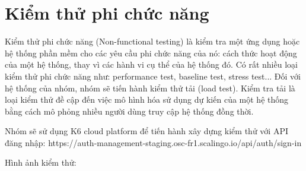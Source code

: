 		\section{Kiểm thử phi chức năng}
		    Kiểm thử phi chức năng (Non-functional testing) là kiểm tra một ứng dụng hoặc hệ thống phần mềm cho các yêu cầu phi chức năng của nó: cách thức hoạt động của một hệ thống, thay vì các hành vi cụ thể của hệ thống đó. Có rất nhiều loại kiểm thử phi chức năng như: performance test, baseline test, stress test... Đối với hệ thống của nhóm, nhóm sẽ tiến hành kiểm thử tải (load test). Kiểm tra tải là loại kiểm thử đề cập đến việc mô hình hóa sử dụng dự kiến của một hệ thống bằng cách mô phỏng nhiều người dùng truy cập hệ thống đồng thời.
		    
		    Nhóm sẽ sử dụng K6 cloud platform để tiến hành xây dựng kiểm thử với API đăng nhập:
		    https://auth-management-staging.osc-fr1.scalingo.io/api/auth/sign-in
		    
		Hình ảnh kiểm thử:
        
